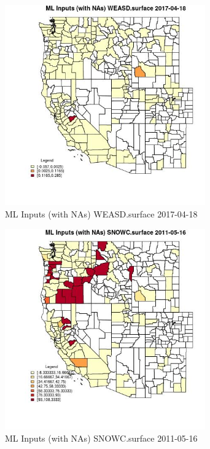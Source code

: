\begin{figure} 
\centering  
\includegraphics[width=0.77\textwidth]{Code_Outputs/Report_ML_input_PM25_Step4_part_e_de_duplicated_aves_compiled_2019-05-21wNAs_CountyWEASDsurfaceMean2017-04-18.jpg} 
\caption{\label{fig:Report_ML_input_PM25_Step4_part_e_de_duplicated_aves_compiled_2019-05-21wNAsCountyWEASDsurfaceMean2017-04-18}ML Inputs (with NAs) WEASD.surface 2017-04-18} 
\end{figure} 
 

\begin{figure} 
\centering  
\includegraphics[width=0.77\textwidth]{Code_Outputs/Report_ML_input_PM25_Step4_part_e_de_duplicated_aves_compiled_2019-05-21wNAs_CountySNOWCsurfaceMean2011-05-16.jpg} 
\caption{\label{fig:Report_ML_input_PM25_Step4_part_e_de_duplicated_aves_compiled_2019-05-21wNAsCountySNOWCsurfaceMean2011-05-16}ML Inputs (with NAs) SNOWC.surface 2011-05-16} 
\end{figure} 
 

